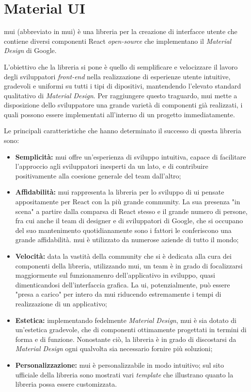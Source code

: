 \section{Material UI}
\acrlong{mui} (abbreviato in \acrshort{mui}) è una libreria per la creazione di interfacce utente che contiene diversi componenti React \textit{open-source} che implementano il \textit{Material Design} di Google.

L'obiettivo che la libreria si pone è quello di semplificare e velocizzare il lavoro degli sviluppatori \textit{front-end} nella realizzazione di esperienze utente intuitive, gradevoli e uniformi su tutti i tipi di dipositivi, mantendendo l'elevato standard qualitativo di \textit{Material Design}. Per raggiungere questo traguardo, \acrlong{mui} mette a disposizione dello sviluppatore una grande varietà di componenti già realizzati, i quali possono essere implementati all'interno di un progetto immediatamente.

Le principali caratteristiche che hanno determinato il successo di questa libreria sono:
\begin{itemize}
  \item \textbf{Semplicità:} \acrshort{mui} offre un'esperienza di sviluppo intuitiva, capace di facilitare l'approccio agli sviluppatori inesperti da un lato, e di contribuire positivamente alla coesione generale del team dall'altro;
  
  \item \textbf{Affidabilità:} \acrshort{mui} rappresenta la libreria per lo sviluppo di \acrshort{ui} pensate appositamente per React con la più grande community. La sua presenza "in scena" a partire dalla comparsa di React stesso e il grande numero di persone, fra cui anche il team di designer e di sviluppatori di Google, che si occupano del suo mantenimento quotidianamente sono i fattori le conferiscono una grande affidabilità. \acrlong{mui} è utilizzato da numerose aziende di tutto il mondo;
  
  \item \textbf{Velocità:} data la vastità della community che si è dedicata alla cura dei componenti della libreria, utilizzando \acrshort{mui}, un team è in grado di focalizzarsi maggiormente sul funzionamenro dell'applicativo in sviluppo, quasi dimenticandosi dell'interfaccia grafica. La \acrshort{ui}, potenzialmente, può essere "presa a carico" per intero da \acrlong{mui} riducendo estremamente i tempi di realizzazione di un applicativo;
  
  \item \textbf{Estetica:} implementando fedelmente \textit{Material Design}, \acrshort{mui} è sia dotato di un'estetica gradevole, che di componenti ottimamente progettati in termini di forma e di funzione. Nonostante ciò, la libreria è in grado di discostarsi da \textit{Material Design} ogni qualvolta sia necessario fornire più soluzioni;
  
  \item \textbf{Personalizzazione:} \acrshort{mui} è personalizzabile in modo intuitivo; sul sito ufficiale della libreria sono mostrati vari \textit{template} che illustrano quanto la libreria possa essere customizzata.
\end{itemize}


